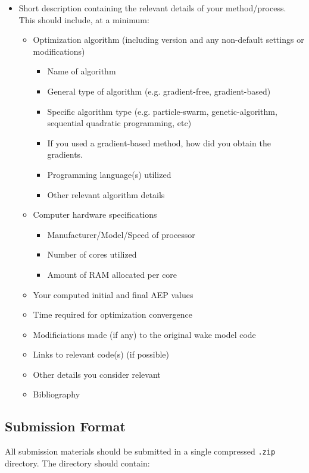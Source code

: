 \documentclass[12pt]{article}
\begin{document}
\begin{itemize}
	\item Short description containing the relevant details of your method/process. This should include, at a minimum:
    \begin{itemize}
        \item Optimization algorithm (including version and any non-default settings or modifications)
        \begin{itemize}
        	\item Name of algorithm
            \item General type of algorithm (e.g. gradient-free, gradient-based)
            \item Specific algorithm type (e.g. particle-swarm, genetic-algorithm, sequential quadratic programming, etc)
            \item If you used a gradient-based method, how did you obtain the gradients.
            \item Programming language(s) utilized
            \item Other relevant algorithm details
        \end{itemize}
        \item Computer hardware specifications
        \begin{itemize}
            \item Manufacturer/Model/Speed of processor
            \item Number of cores utilized
            \item Amount of RAM allocated per core
        \end{itemize}
        \item Your computed initial and final AEP values
        \item Time required for optimization convergence
        \item Modificiations made (if any) to the original wake model code
        \item Links to relevant code(s) (if possible)
        \item Other details you consider relevant
        \item Bibliography
    \end{itemize}
\end{itemize}
\subsection{Submission Format}
    All submission materials should be submitted in a single compressed \texttt{.zip} directory. The directory should contain:
    
\end{document}
